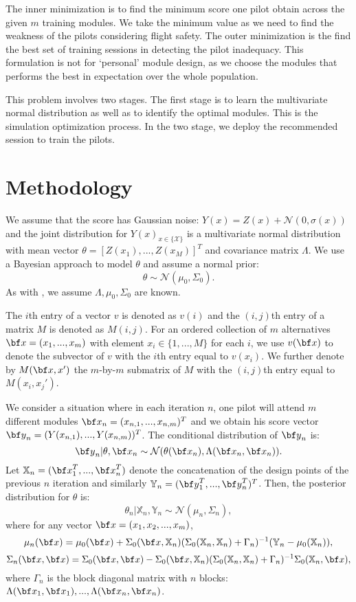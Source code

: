 \documentclass[opre,sglanonrev]{informs4}
\begin{document}
The inner minimization is to find the minimum score one pilot obtain across the given $m$ training modules. We take the minimum value as we need to find the weakness of the pilots considering flight safety. The outer minimization is the find the best set of training sessions in detecting the pilot inadequacy.
This formulation is not for `personal' module design, as we choose the modules that performs the best in expectation over the whole population. 

This problem involves two stages. The first stage is to learn the multivariate normal distribution as well as to identify the optimal modules. This is the simulation optimization process. In the two stage, we deploy the recommended session to train the pilots. 

\section{Methodology}

We assume that the score has Gaussian noise: $Y(x) = Z(x) + \mathcal{N}(0,\sigma(x))$ and the joint distribution for $Y(x)_{x\in\{\mathcal{X}\}}$ is a multivariate normal distribution with mean vector $\theta = [Z(x_1),...,Z(x_M)]^T$ and covariance matrix $\Lambda$. We use a Bayesian approach to model $\theta$ and assume a normal prior:
$$\theta \sim \mathcal{N}(\mu_0, \Sigma_0). $$
As with \cite{xie2016bayesian}, we assume $\Lambda, \mu_0, \Sigma_0$ are known.

The $i$th entry of a vector $v$ is denoted as $v(i)$ and the $(i,j)$th entry of a matrix $M$ is denoted as $M(i,j)$. For an ordered collection of $m$ alternatives ${\bf x}=(x_1,...,x_m)$ with element $x_i \in \{1,...,M\}$ for each $i$, we use $v(\bf x)$ to denote the subvector of $v$ with the $i$th entry equal to $v(x_i)$. We further denote by $M(\bf x, x')$ the $m$-by-$m$ submatrix of $M$ with the $(i,j)$th entry equal to $M(x_i, x_j')$.  

We consider a situation where in each iteration $n$, one pilot will attend $m$ different modules ${\bf x}_n = (x_{n,1},...,x_{n,m})^T$ and we obtain his score vector ${\bf y}_n = (Y(x_{n,1}),...,Y(x_{n,m}))^T$. The conditional distribution of ${\bf y}_n$ is:
$${\bf y}_n | \theta,{\bf x}_n \sim \mathcal{N}(\theta({\bf x}_n), \Lambda({\bf x}_n,{\bf x}_n)). $$ 
Let $\mathbb{X}_n = ({\bf x}_1^T,...,{\bf x}_n^T )$ denote the concatenation of the design points of the previous $n$ iteration and similarly $\mathbb{Y}_n =({\bf y}_1^T,...,{\bf y}_n^T )^T$. Then, the posterior distribution for $\theta$ is:
$$\theta_n|\mathbb{X}_n,\mathbb{Y}_n  \sim \mathcal{N}(\mu_n, \Sigma_n),$$
where for any vector ${\bf x} = (x_1, x_2,...,x_m)$,
$$
	\mu_n({\bf x}) = \mu_0({\bf x}) + \Sigma_0(\bf x, \mathbb{X}_n)(\Sigma_0(\mathbb{X}_n,\mathbb{X}_n) + \Gamma_n)^{-1}(\mathbb{Y}_n-\mu_0(\mathbb{X}_n)),
$$
$$
	\Sigma_n({\bf x},{\bf x}) = \Sigma_0({\bf x},{\bf x}) - \Sigma_0(\bf x, \mathbb{X}_n)(\Sigma_0(\mathbb{X}_n,\mathbb{X}_n) + \Gamma_n)^{-1}\Sigma_0(\mathbb{X}_n, \bf x),
$$
where $\Gamma_n$ is the block diagonal matrix with $n$ blocks: $\Lambda({\bf x}_1, {\bf x}_1),...,\Lambda({\bf x}_n, {\bf x}_n)$.
\end{document}
